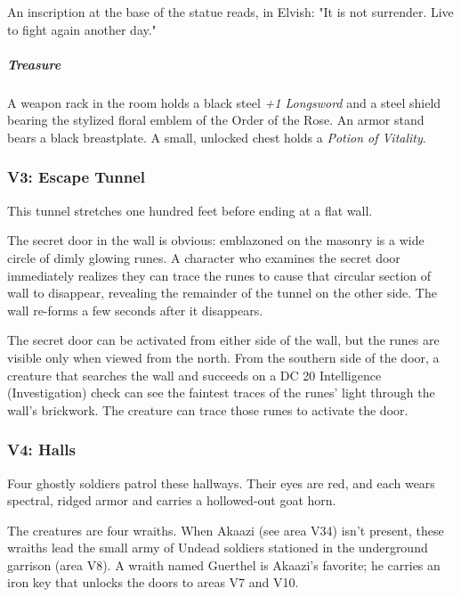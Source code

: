 \documentclass[10pt,a4paper,twoside,bg=print,twocolumn,openany,nodeprecatedcode]{dndbook}
\begin{document}
An inscription at the base of the statue reads, in Elvish: "It is not surrender. Live to fight again another day."

\subparagraph{Treasure}
A weapon rack in the room holds a black steel \textit{+1 Longsword} and a steel shield bearing the stylized floral emblem of the Order of the Rose. An armor stand bears a black breastplate. A small, unlocked chest holds a \textit{Potion of Vitality}.

\subsubsection{V3: Escape Tunnel}
\begin{DndReadAloud}{}
This tunnel stretches one hundred feet before ending at a flat wall.

\end{DndReadAloud}

The secret door in the wall is obvious: emblazoned on the masonry is a wide circle of dimly glowing runes. A character who examines the secret door immediately realizes they can trace the runes to cause that circular section of wall to disappear, revealing the remainder of the tunnel on the other side. The wall re-forms a few seconds after it disappears.

The secret door can be activated from either side of the wall, but the runes are visible only when viewed from the north. From the southern side of the door, a creature that searches the wall and succeeds on a DC 20 Intelligence (Investigation) check can see the faintest traces of the runes' light through the wall's brickwork. The creature can trace those runes to activate the door.

\subsubsection{V4: Halls}
\begin{DndReadAloud}{}
Four ghostly soldiers patrol these hallways. Their eyes are red, and each wears spectral, ridged armor and carries a hollowed-out goat horn.

\end{DndReadAloud}

The creatures are four wraiths. When Akaazi (see area V34) isn't present, these wraiths lead the small army of Undead soldiers stationed in the underground garrison (area V8). A wraith named Guerthel is Akaazi's favorite; he carries an iron key that unlocks the doors to areas V7 and V10.
\end{document}
